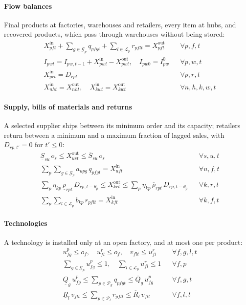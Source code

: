\documentclass[review,11pt,nonatbib]{elsarticle}
\theoremstyle{remark}
\newcommand{\Xin}{X^{\mathrm{in}}}
\newcommand{\Xout}{X^{\mathrm{out}}}
\begin{document}
\paragraph{Flow balances} Final products at factories, warehouses and retailers, every item at hubs, and recovered products, which pass through warehouses without being stored:
\begin{align}
& \Xin_{pft} + \textstyle\sum_{g \in \mathcal{G}_p} q_{pfgt} + \sum_{l \in \mathcal{L}_p} r_{pflt} = \Xout_{pft} && \forall p, f, t \label{eq:balance-factory}\\
& I_{pwt} = I_{pw,t-1} + \Xin_{pwt} - \Xout_{pwt}, \quad I_{pw0} = I^0_{pw} && \forall p, w, t \label{eq:inventory}\\
& \Xin_{prt} = D_{rpt} && \forall p, r, t \label{eq:demand}\\
& \Xin_{nht} = \Xout_{nht}, \quad \Xin_{kwt} = \Xout_{kwt} && \forall n, h, k, w, t \label{eq:transit}
\end{align}

\paragraph{Supply, bills of materials and returns} A selected supplier ships between its minimum order and its capacity; retailers return between a minimum and a maximum fraction of lagged sales, with $D_{rp,t'} = 0$ for $t' \le 0$:
\begin{align}
& \underline{S}_{su}\, o_s \le \Xout_{ust} \le \overline{S}_{su}\, o_s && \forall s, u, t \label{eq:supply}\\
& \textstyle\sum_{p} \sum_{g \in \mathcal{G}_p} a_{upg}\, q_{pfgt} = \Xin_{uft} && \forall u, f, t \label{eq:bom}\\
& \textstyle\sum_{p} \eta_{kp}\, \underline{\rho}_{rpt}\, D_{rp,t-\theta_p} \le \Xout_{krt} \le \sum_{p} \eta_{kp}\, \overline{\rho}_{rpt}\, D_{rp,t-\theta_p} && \forall k, r, t \label{eq:returns}\\
& \textstyle\sum_{p} \sum_{l \in \mathcal{L}_p} b_{kp}\, r_{pflt} = \Xin_{kft} && \forall k, f, t \label{eq:rem-bom}
\end{align}

\paragraph{Technologies} A technology is installed only at an open factory, and at most one per product:
\begin{align}
& u^{p}_{fg} \le o_f, \quad u^{r}_{fl} \le o_f, \quad v_{flt} \le u^{r}_{fl} && \forall f, g, l, t \label{eq:tech-open}\\
& \textstyle\sum_{g \in \mathcal{G}_p} u^{p}_{fg} \le 1, \quad \sum_{l \in \mathcal{L}_p} u^{r}_{fl} \le 1 && \forall f, p \label{eq:tech-one}\\
& \underline{Q}_g\, u^{p}_{fg} \le \textstyle\sum_{p \in \mathcal{P}_g} q_{pfgt} \le \overline{Q}_g\, u^{p}_{fg} && \forall f, g, t \label{eq:prod-cap}\\
& \underline{R}_l\, v_{flt} \le \textstyle\sum_{p \in \mathcal{P}_l} r_{pflt} \le \overline{R}_l\, v_{flt} && \forall f, l, t \label{eq:rem-cap}
\end{align}
\end{document}
